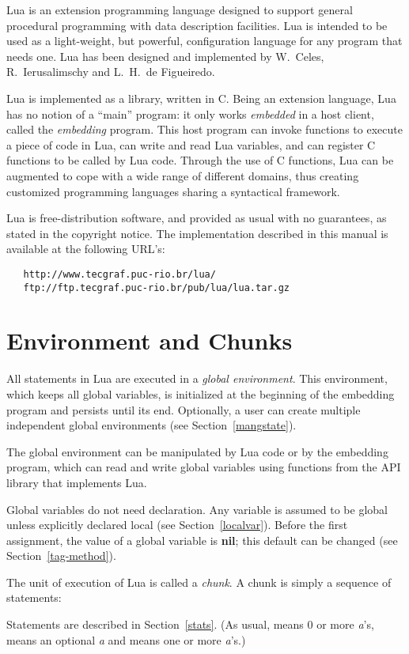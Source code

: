 \documentclass[11pt]{article}
\newcommand{\See}[1]{Section~\ref{#1}}
\newcommand{\see}[1]{(see \See{#1})}
\newcommand{\nil}{{\bf nil}}
\newcommand{\Index}[1]{#1\index{#1}}
\newcommand{\Def}[1]{\emph{#1}\index{#1}}
\begin{document}
Lua is an extension programming language designed to support
general procedural programming with data description
facilities.
Lua is intended to be used as a light-weight, but powerful,
configuration language for any program that needs one.
Lua has been designed and implemented by
W.~Celes,
R.~Ierusalimschy and
L.~H.~de Figueiredo.

Lua is implemented as a library, written in C.
Being an extension language, Lua has no notion of a ``main'' program:
it only works \emph{embedded} in a host client,
called the \emph{embedding} program.
This host program can invoke functions to execute a piece of
code in Lua, can write and read Lua variables,
and can register C functions to be called by Lua code.
Through the use of C functions, Lua can be augmented to cope with
a wide range of different domains,
thus creating customized programming languages sharing a syntactical framework.

Lua is free-distribution software,
and provided as usual with no guarantees,
as stated in the copyright notice.
The implementation described in this manual is available
at the following URL's:
\begin{verbatim}
   http://www.tecgraf.puc-rio.br/lua/
   ftp://ftp.tecgraf.puc-rio.br/pub/lua/lua.tar.gz
\end{verbatim}


\section{Environment and Chunks}

All statements in Lua are executed in a \Def{global environment}.
This environment, which keeps all global variables,
is initialized at the beginning of the embedding program and
persists until its end.
Optionally, a user can create multiple independent global
environments \see{mangstate}.

The global environment can be manipulated by Lua code or
by the embedding program,
which can read and write global variables
using functions from the API library that implements Lua.

\Index{Global variables} do not need declaration.
Any variable is assumed to be global unless explicitly declared local
\see{localvar}.
Before the first assignment, the value of a global variable is \nil;
this default can be changed \see{tag-method}.

The unit of execution of Lua is called a \Def{chunk}.
A chunk is simply a sequence of statements:
\begin{Produc}
\end{Produc}%
Statements are described in \See{stats}.
(As usual,  means 0 or more \emph{a}'s,
 means an optional \emph{a} and  means
one or more \emph{a}'s.)
\end{document}
